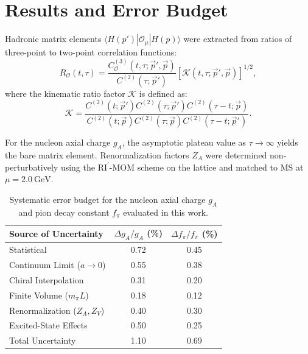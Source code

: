 \documentclass{proc}
\begin{document}
\section{Results and Error Budget}
Hadronic matrix elements $\langle H(p') | \mathcal{O}_{\mu} | H(p) \rangle$ were extracted from ratios of three-point to two-point correlation functions:
\begin{equation}
R_\mathcal{O}(t, \tau) = \frac{C^{(3)}_\mathcal{O}(t, \tau; \vec{p}', \vec{p})}{C^{(2)}(\tau; \vec{p}')} \left[ \mathcal{K}(t, \tau; \vec{p}', \vec{p}) \right]^{1/2},
\end{equation}
where the kinematic ratio factor $\mathcal{K}$ is defined as:
\begin{equation}
\mathcal{K} = \frac{C^{(2)}(t; \vec{p}') C^{(2)}(\tau; \vec{p}') C^{(2)}(\tau - t; \vec{p})}{C^{(2)}(t; \vec{p}) C^{(2)}(\tau; \vec{p}) C^{(2)}(\tau - t; \vec{p}')}.
\end{equation}

For the nucleon axial charge $g_A$, the asymptotic plateau value as $\tau \to \infty$ yields the bare matrix element. Renormalization factors $Z_A$ were determined non-perturbatively using the $\text{RI}^\prime\text{-MOM}$ scheme on the lattice and matched to $\overline{\text{MS}}$ at $\mu = 2.0~\text{GeV}$.

\begin{table}[t]
\caption{Systematic error budget for the nucleon axial charge $g_A$ and pion decay constant $f_\pi$ evaluated in this work.}
\label{tab:systematics}
\vspace{4pt}
\centering
\small
\setlength{\tabcolsep}{3.5pt}
\begin{tabular}{lcc}
\toprule
Source of Uncertainty & $\Delta g_A / g_A$ (\%) & $\Delta f_\pi / f_\pi$ (\%) \\
\midrule
Statistical & 0.72 & 0.45 \\{}
Continuum Limit ($a \to 0$) & 0.55 & 0.38 \\{}
Chiral Interpolation & 0.31 & 0.20 \\{}
Finite Volume ($m_\pi L$) & 0.18 & 0.12 \\{}
Renormalization ($Z_A, Z_V$) & 0.40 & 0.30 \\{}
Excited-State Effects & 0.50 & 0.25 \\
\midrule
Total Uncertainty & 1.10 & 0.69 \\
\bottomrule
\end{tabular}
\end{table}
\end{document}
